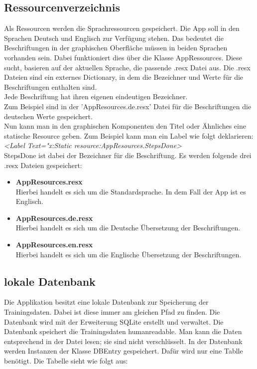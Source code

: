 \documentclass[a4paper,12pt]{article}
\begin{document}
\subsection{Ressourcenverzeichnis}
Als Ressourcen werden die Sprachressourcen gespeichert. Die App soll in den Sprachen Deutsch und Englisch zur Verfügung stehen. Das bedeutet die Beschriftungen in der graphischen Oberfläche müssen in beiden Sprachen vorhanden sein. Dabei funktioniert dies über die Klasse AppRessources. Diese sucht, basieren auf der aktuellen Sprache, die passende .resx Datei aus. Die .resx Dateien sind ein externes Dictionary, in dem die Bezeichner und Werte für die Beschriftungen enthalten sind.\\
Jede Beschriftung hat ihren eigenen eindeutigen Bezeichner. \\Zum Beispiel sind in der 'AppResources.de.resx' Datei für die Beschriftungen die deutschen Werte gespeichert.\\
Nun kann man in den graphischen Komponenten den Titel oder Ähnliches eine statische Resource geben.
Zum Beispiel kann man ein Label wie folgt deklarieren:\\\textit{<Label Text="{x:Static resource:AppResources.StepsDone}>}\\ StepsDone ist dabei der Bezeichner für die Beschriftung.
Es werden folgende drei .resx Dateien gespeichert: 
\begin{itemize}
	\item[] \textbf{AppResources.resx}\\Hierbei handelt es sich um die Standardsprache. In dem Fall der App ist es Englisch.
	\item[] \textbf{AppResources.de.resx}\\Hierbei handelt es sich um die Deutsche Übersetzung der Beschriftungen.
	\item[] \textbf{AppResources.en.resx}\\Hierbei handelt es sich um die Englische Übersetzung der Beschriftungen.
\end{itemize}

\subsection{lokale Datenbank}
Die Applikation besitzt eine lokale \gls{Datenbank} zur Speicherung der Trainingsdaten. Dabei ist diese immer am gleichen Pfad zu finden. Die Datenbank wird mit der Erweiterung \gls{SQLite} erstellt und verwaltet. Die Datenbank speichert die Trainingsdaten humanreadable. Man kann die Daten entsprechend in der Datei lesen; sie sind nicht verschlüsselt. In der Datenbank werden Instanzen der Klasse DBEntry gespeichert. Dafür wird nur eine Tablle benötigt. Die Tabelle sieht wie folgt aus:
\end{document}
